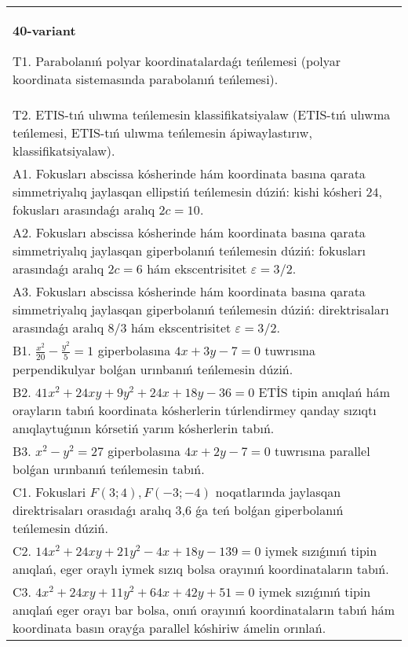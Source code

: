 \documentclass{article}
\begin{document}
\begin{tabular}{m{17cm}}
\textbf{40-variant}
\newline

T1. Parabolanıń polyar koordinatalardaǵı teńlemesi (polyar koordinata sistemasında parabolanıń teńlemesi).\\

T2. ETIS-tıń ulıwma teńlemesin klassifikatsiyalaw (ETIS-tıń ulıwma teńlemesi, ETIS-tıń ulıwma teńlemesin ápiwaylastırıw, klassifikatsiyalaw).\\

A1. Fokusları abscissa kósherinde hám koordinata basına qarata simmetriyalıq jaylasqan ellipstiń teńlemesin dúziń: kishi kósheri $24$, fokusları arasındaǵı aralıq $2 c=10$.\\

A2. Fokusları abscissa kósherinde hám koordinata basına qarata simmetriyalıq jaylasqan giperbolanıń teńlemesin dúziń: fokusları arasındaǵı aralıq $2 c=6$ hám ekscentrisitet $\varepsilon=3/2$.\\

A3. Fokusları abscissa kósherinde hám koordinata basına qarata simmetriyalıq jaylasqan giperbolanıń teńlemesin dúziń: direktrisaları arasındaǵı aralıq $8/3$ hám ekscentrisitet $\varepsilon=3/2$.\\

B1. $\frac{x^{2}}{20} - \frac{y^{2}}{5} = 1$ giperbolasına $4x + 3y - 7 = 0$ tuwrısına perpendikulyar bolǵan urınbanıń teńlemesin dúziń.  \\

B2. $41x^{2} + 24xy + 9y^{2} + 24x + 18y - 36 = 0$ ETİS tipin anıqlań hám orayların tabıń koordinata kósherlerin túrlendirmey qanday sızıqtı anıqlaytuǵının kórsetiń yarım kósherlerin tabıń.  \\

B3. $x^{2} - y^{2} = 27$ giperbolasına $4x + 2y - 7 = 0$ tuwrısına parallel bolǵan urınbanıń teńlemesin tabıń.  \\

C1. Fokuslari $F(3;4), F(-3;-4)$ noqatlarında jaylasqan direktrisaları orasıdaǵı aralıq 3,6 ǵa teń bolǵan giperbolanıń teńlemesin dúziń.  \\

C2. $14x^{2} + 24xy + 21y^{2} - 4x + 18y - 139 = 0$ iymek sızıǵınıń tipin anıqlań, eger oraylı iymek sızıq bolsa orayınıń koordinataların tabıń.  \\

C3. $4x^{2} + 24xy + 11y^{2} + 64x + 42y + 51 = 0$ iymek sızıǵınıń tipin anıqlań eger orayı bar bolsa, onıń orayınıń koordinataların tabıń hám koordinata basın orayǵa parallel kóshiriw ámelin orınlań.  \\

\end{tabular}
\vspace{1cm}
\end{document}

